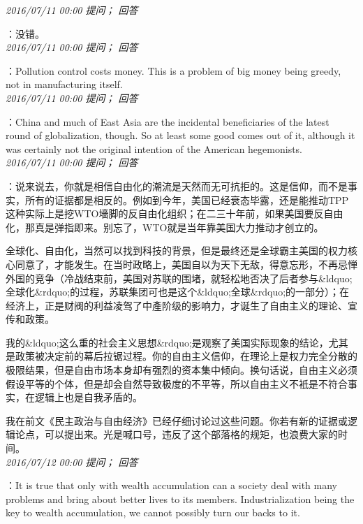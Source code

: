 \documentclass[twocolumn]{ctexart}
\begin{document}
\textit{\hfill\noindent\small 2016/07/11 00:00 提问； 回答}

：没错。\\

\textit{\hfill\noindent\small 2016/07/11 00:00 提问； 回答}

：Pollution control costs money. This is a problem of big money being greedy, not in manufacturing itself.\\

\textit{\hfill\noindent\small 2016/07/11 00:00 提问； 回答}

：China and much of East Asia are the incidental beneficiaries of the latest round of globalization, though. So at least some good comes out of it, although it was certainly not the original intention of the American hegemonists.\\

\textit{\hfill\noindent\small 2016/07/11 00:00 提问； 回答}

：说来说去，你就是相信自由化的潮流是天然而无可抗拒的。这是信仰，而不是事实，所有的证据都是相反的。例如到今年，美国已经衰态毕露，还是能推动TPP这种实际上是挖WTO墻脚的反自由化组织；在二三十年前，如果美国要反自由化，那真是弹指即来。别忘了，WTO就是当年靠美国大力推动才创立的。

全球化、自由化，当然可以找到科技的背景，但是最终还是全球霸主美国的权力核心同意了，才能发生。在当时政略上，美国自以为天下无敌，得意忘形，不再忌惮外国的竞争（冷战结束前，美国对苏联的围堵，就轻松地否决了后者参与\&ldquo;全球化\&rdquo;的过程，苏联集团可也是这个\&ldquo;全球\&rdquo;的一部分）；在经济上，正是财阀的利益凌驾了中產阶级的影响力，才诞生了自由主义的理论、宣传和政策。

我的\&ldquo;这么重的社会主义思想\&rdquo;是观察了美国实际现象的结论，尤其是政策被决定前的幕后拉锯过程。你的自由主义信仰，在理论上是权力完全分散的极限结果，但是自由市场本身却有强烈的资本集中倾向。换句话说，自由主义必须假设平等的个体，但是却会自然导致极度的不平等，所以自由主义不衹是不符合事实，在逻辑上也是自我矛盾的。

我在前文《民主政治与自由经济》已经仔细讨论过这些问题。你若有新的证据或逻辑论点，可以提出来。光是喊口号，违反了这个部落格的规矩，也浪费大家的时间。\\

\textit{\hfill\noindent\small 2016/07/12 00:00 提问； 回答}

：It is true that only with wealth accumulation can a society deal with many problems and bring about better lives to its members. Industrialization being the key to wealth accumulation, we cannot possibly turn our backs to it.
\end{document}

